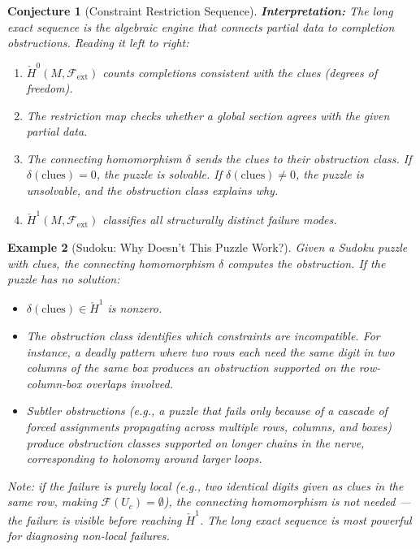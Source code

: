 \documentclass[11pt,letterpaper]{article}
\newtheorem{conjecture}{Conjecture}[section]
\newtheorem{example}[conjecture]{Example}
\newcommand{\Hcech}{\check{H}}
\newcommand{\sheaf}{\mathcal{F}}
\begin{document}
\begin{conjecture}[Constraint Restriction 
Sequence]
\textbf{Interpretation:} The long exact sequence is the algebraic 
engine that connects partial data to completion obstructions. Reading 
it left to right:
\begin{enumerate}
    \item $\Hcech^0(M, \sheaf_{\mathrm{ext}})$ counts completions 
    consistent with the clues (degrees of freedom).
    \item The restriction map checks whether a global section agrees 
    with the given partial data.
    \item The connecting homomorphism $\delta$ sends the clues to their 
    obstruction class. If $\delta(\text{clues}) = 0$, the puzzle is 
    solvable. If $\delta(\text{clues}) \neq 0$, the puzzle is 
    unsolvable, and the obstruction class explains \emph{why}.
    \item $\Hcech^1(M, \sheaf_{\mathrm{ext}})$ classifies all 
    structurally distinct failure modes.
\end{enumerate}
\end{conjecture}

\begin{example}[Sudoku: Why Doesn't This Puzzle Work?]
Given a Sudoku puzzle with clues, the connecting homomorphism $\delta$ 
computes the obstruction. If the puzzle has no solution:
\begin{itemize}
    \item $\delta(\text{clues}) \in \Hcech^1$ is nonzero.
    \item The obstruction class identifies which \emph{constraints} are 
    incompatible. For instance, a deadly pattern where two rows each 
    need the same digit in two columns of the same box produces an 
    obstruction supported on the row-column-box overlaps involved.
    \item Subtler obstructions (e.g., a puzzle that fails only because 
    of a cascade of forced assignments propagating across multiple 
    rows, columns, and boxes) produce obstruction classes supported on 
    longer chains in the nerve, corresponding to holonomy around larger 
    loops.
\end{itemize}
Note: if the failure is purely local (e.g., two identical digits given 
as clues in the same row, making $\sheaf(U_c) = \emptyset$), the 
connecting homomorphism is not needed --- the failure is visible before 
reaching $\Hcech^1$. The long exact sequence is most powerful for 
diagnosing \emph{non-local} failures.
\end{example}
\end{document}
